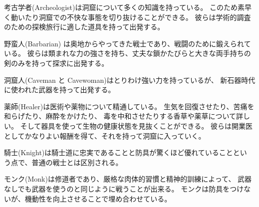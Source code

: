 \blist{}
\item[\bb{Archeologists}]%
考古学者(Archeologist)は洞窟について多くの知識を持っている。
このため素早く動いたり洞窟での不快な事態を切り抜けることができる。
彼らは学術的調査のための探検旅行に適した道具を持って出発する。
\item[\bb{Barbarians}]%
野蛮人(Barbarian) は奥地からやってきた戦士であり、戦闘のために鍛えられている。
彼らは類まれな力の強さを持ち、丈夫な鎖かたびらと大きな両手持ちの
剣のみを持って探求に出発する。
\item[\bb{Cavemen {\rm and} Cavewomen}]
洞窟人(Caveman と Cavewoman)はとりわけ強い力を持っているが、
新石器時代に使われた武器を持って出発する。
\item[\bb{Healers}]%
薬師(Healer)は医術や薬物について精通している。
生気を回復させたり、苦痛を和らげたり、麻酔をかけたり、
毒を中和させたりする香草や薬草について詳しい。
そして器具を使って生物の健康状態を見抜くことができる。
彼らは開業医としてかなりよい報酬を得て、それを持って洞窟に入っていく。
\item[\bb{Knights}]%
騎士(Knight)は騎士道に忠実であることと防具が驚くほど優れていることとい
う点で、普通の戦士とは区別される。
\item[\bb{Monks}]%
モンク(Monk)は修道者であり、厳格な肉体的習慣と精神的訓練によって、
武器なしでも武器を使うのと同じように戦うことが出来る。
モンクは防具をつけないが、機動性を向上させることで埋め合わせている。
